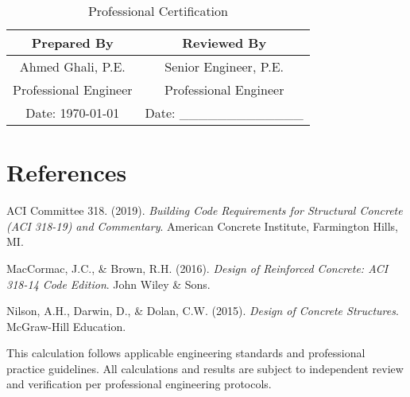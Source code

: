 \documentclass[
  10pt,
  letterpaper,
  twocolumn
]{article}
\begin{document}
\begin{table}[h]
\centering
\caption*{Professional Certification}
\begin{tabular}{@{}cc@{}}
\toprule
\textbf{Prepared By} & \textbf{Reviewed By} \\
\midrule
Ahmed Ghali, P.E. & Senior Engineer, P.E. \\
Professional Engineer & Professional Engineer \\
Date: \today & Date: \_\_\_\_\_\_\_\_\_\_\_\_\_ \\
\bottomrule
\end{tabular}
\end{table}

\section*{References}

\begin{thebibliography}{9}
ACI Committee 318. (2019). \textit{Building Code Requirements for Structural Concrete (ACI 318-19) and Commentary}. American Concrete Institute, Farmington Hills, MI.

MacCormac, J.C., \& Brown, R.H. (2016). \textit{Design of Reinforced Concrete: ACI 318-14 Code Edition}. John Wiley \& Sons.

Nilson, A.H., Darwin, D., \& Dolan, C.W. (2015). \textit{Design of Concrete Structures}. McGraw-Hill Education.
\end{thebibliography}

\vspace{0.3cm}
{\scriptsize\textcolor{ghaligray}{
This calculation follows applicable engineering standards and professional practice guidelines. All calculations and results are subject to independent review and verification per professional engineering protocols.
}}
\end{document}
